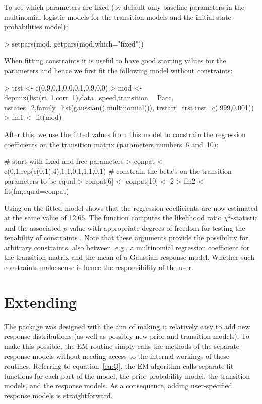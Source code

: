 \documentclass[article]{jss}
\begin{document}
To see which parameters are fixed (by default only baseline parameters
in the multinomial logistic models for the transition models and the
initial state probabilities model):
\begin{CodeChunk}
\begin{CodeInput}
> setpars(mod, getpars(mod,which="fixed"))
\end{CodeInput}
\end{CodeChunk}

When fitting constraints it is useful to have good starting values 
for the parameters and hence we first fit the following model without
constraints:
\begin{CodeChunk}
\begin{CodeInput}
> trst <- c(0.9,0.1,0,0,0.1,0.9,0,0)
> mod <- depmix(list(rt~1,corr~1),data=speed,transition=~Pacc,
	  nstates=2,family=list(gaussian(),multinomial()),
	  trstart=trst,inst=c(.999,0.001))
> fm1 <- fit(mod)
\end{CodeInput}
\end{CodeChunk}
After this, we use the fitted values from this model to constrain the
regression coefficients on the transition matrix (parameters numbers~6
and~10):
\begin{CodeChunk}
\begin{CodeInput}
# start with fixed and free parameters
> conpat <- c(0,1,rep(c(0,1),4),1,1,0,1,1,1,0,1)
# constrain the beta's on the transition parameters to be equal
> conpat[6] <- conpat[10] <- 2
> fm2 <- fit(fm,equal=conpat)
\end{CodeInput}
\end{CodeChunk}
Using  on the fitted model shows that the regression 
coefficients are now estimated at the same value of 12.66. The function
 computes the likelihood ratio $\chi^2$-statistic and the
associated $p$-value with appropriate degrees of freedom for testing the
tenability of constraints \citep{Dannemann2007}. Note that these arguments 
provide the possibility for arbitrary 
constraints, also between, e.g., a multinomial regression coefficient 
for the transition matrix and the mean of a Gaussian response model. 
Whether such constraints make sense is hence the responsibility of 
the user. 

\section[Extending depmixS4]{Extending }

The  package was designed with the aim of making it
relatively easy to add new response distributions (as well as possibly
new prior and transition models).  To make this possible, the EM
routine simply calls the  methods of the separate response
models without needing access to the internal workings of these
routines.  Referring to equation~\ref{eq:Q}, the EM algorithm calls
separate fit functions for each part of the model, the prior
probability model, the transition models, and the response models.  As
a consequence, adding user-specified response models is
straightforward.
\end{document}

